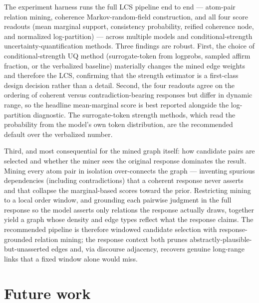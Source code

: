 \documentclass[11pt]{article}
\begin{document}
The experiment harness runs the full LCS pipeline end to end --- atom-pair
relation mining, coherence Markov-random-field construction, and all four score
readouts (mean marginal support, consistency probability, reified coherence node,
and normalized log-partition) --- across multiple models and conditional-strength
uncertainty-quantification methods. Three findings are robust. First, the choice
of conditional-strength UQ method (surrogate-token from logprobs, sampled affirm
fraction, or the verbalized baseline) materially changes the mined edge weights
and therefore the LCS, confirming that the strength estimator is a first-class
design decision rather than a detail. Second, the four readouts agree on the
ordering of coherent versus contradiction-bearing responses but differ in dynamic
range, so the headline mean-marginal score is best reported alongside the
log-partition diagnostic. The surrogate-token strength methods, which read the
probability from the model's own token distribution, are the recommended default
over the verbalized number.

Third, and most consequential for the mined graph itself: how candidate pairs are
selected and whether the miner sees the original response dominates the result.
Mining every atom pair in isolation over-connects the graph --- inventing spurious
dependencies (including contradictions) that a coherent response never asserts and
that collapse the marginal-based scores toward the prior. Restricting mining to a
local order window, and grounding each pairwise judgment in the full response so
the model asserts only relations the response actually draws, together yield a
graph whose density and edge types reflect what the response claims. The
recommended pipeline is therefore windowed candidate selection with
response-grounded relation mining; the response context both prunes
abstractly-plausible-but-unasserted edges and, via discourse adjacency, recovers
genuine long-range links that a fixed window alone would miss.

\section{Future work}
\end{document}
